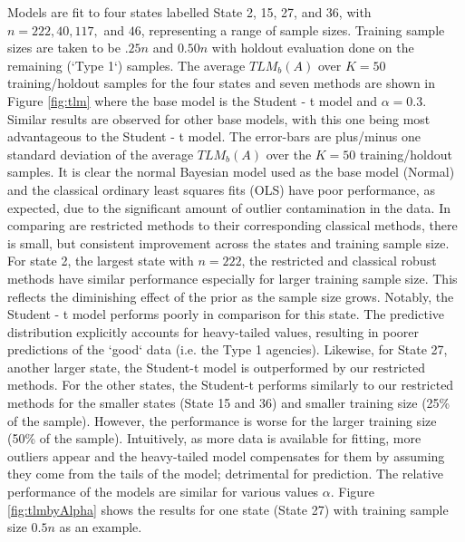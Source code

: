 \documentclass[ba]{imsart}
\newcommand{\by}{\mbox{\boldmath $y$}}
\begin{document}
Models are fit to four states labelled State 2, 15, 27, and 36, with $n = 222, 40, 117,$ and $46$, representing a range of sample sizes. Training sample sizes are taken to be $.25n$ and $0.50n$ with holdout evaluation done on the remaining (`Type 1`) samples. The average $TLM_b(A)$ over $K = 50$ training/holdout samples for the four states and seven methods are shown in Figure \ref{fig:tlm} where the base model is the Student - t model and $\alpha = 0.3$. Similar results are observed for other base models, with this one being most advantageous to the Student - t model. The error-bars are plus/minus one standard deviation of the average $TLM_b(A)$ over the $K = 50$  training/holdout samples. It is clear the normal Bayesian model used as the base model (Normal) and the classical ordinary least squares fits (OLS) have poor performance, as expected, due to the significant amount of outlier contamination in the data. In comparing are restricted methods to their corresponding classical methods, there is small, but consistent improvement across the states and training sample size. For state 2, the largest state with $n = 222$, the restricted and classical robust methods have similar performance especially for larger training sample size. This reflects the diminishing effect of the prior as the sample size grows. Notably, the Student - t model performs poorly in comparison for this state. The predictive distribution explicitly accounts for heavy-tailed values, resulting in poorer predictions of the `good` data (i.e. the Type 1 agencies). Likewise, for State 27, another larger state, the Student-t model is outperformed by our restricted methods.   For the other states, the Student-t performs similarly to our restricted methods for the smaller states (State 15 and 36) and smaller training size (25\% of the sample). However, the performance is worse for the larger training size (50\% of the sample). Intuitively, as more data is available for fitting, more outliers appear and the heavy-tailed model compensates for them by assuming they come from the tails of the model; detrimental for prediction. The relative performance of the models are similar for various values $\alpha$. Figure \ref{fig:tlmbyAlpha} shows the results for one state (State 27) with training sample size $0.5n$ as an example. 



\end{document}

